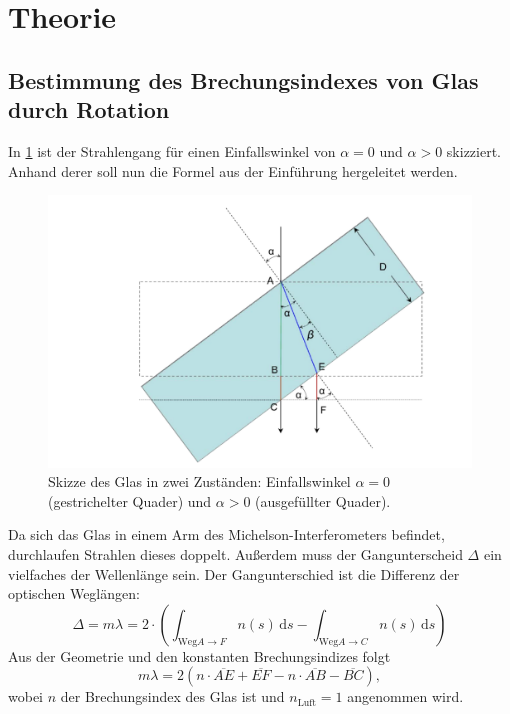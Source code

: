 \documentclass[
	a4paper,
	12pt,
	pagesize,
	ngerman
]{scrartcl}
\begin{document}
	\section{Theorie}
	\subsection{Bestimmung des Brechungsindexes von Glas durch Rotation} %
	In \cref{fig_glass_rotation} ist der Strahlengang für einen Einfallswinkel von $\alpha=0$ und $\alpha>0$ skizziert.
	Anhand derer soll nun die Formel aus der Einführung hergeleitet werden. %
	\begin{figure}[H]
		\includegraphics[width=1.0\textwidth]{images/Formula}
		\centering
		\caption{Skizze des Glas in zwei Zuständen: Einfallswinkel $\alpha= 0$ (gestrichelter Quader) und $\alpha>0$ (ausgefüllter Quader).\cite{GlasFormula}} %
		\label{fig_glass_rotation}
		\centering
	\end{figure}

	Da sich das Glas in einem Arm des Michelson-Interferometers befindet, durchlaufen Strahlen dieses doppelt.
	Außerdem muss der Gangunterscheid $\Delta$ ein vielfaches der Wellenlänge sein. Der Gangunterschied ist die Differenz der optischen Weglängen:
	\begin{equation}
		\Delta = m\lambda = 2 \cdot \left(\int_{\text{Weg} A \rightarrow F} \! n(s) \, \mathrm{d}s - \int_{\text{Weg} A \rightarrow C} \! n(s) \, \mathrm{d}s \right)
	\end{equation}
	Aus der Geometrie und den konstanten Brechungsindizes folgt
	\begin{equation}
		m\lambda = 2(n\cdot \overline{AE} + \overline{EF} - n \cdot \overline{AB} - \overline{BC}),
		\label{eq_glas_2}
	\end{equation}
	wobei $n$ der Brechungsindex des Glas ist und $n_\text{Luft}=1$ angenommen wird.
\end{document}
